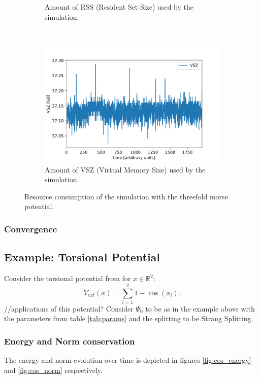 \documentclass{article}
\begin{document}
\begin{figure}[H]
\begin{subfigure}[b]{0.5 \textwidth}
    \caption{Amount of RSS (Resident Set Size) used by the simulation.}
  \end{subfigure}
  ~
  \begin{subfigure}[b]{0.5 \textwidth}
    \includegraphics[width = \textwidth]{graphics/threefold_morse/threefold_VSZ.pdf}
    \caption{Amount of VSZ (Virtual Memory Size) used by the simulation.}
  \end{subfigure}
  \caption{Resource consumption of the simulation with the threefold morse potential.}
  \label{fig:threefold_resource}
\end{figure}

\subsubsection{Convergence}


\subsection{Example: Torsional Potential}
Consider the torsional potential from \cite{torsional} for $x \in \mathbb{R}^2$:
\begin{equation}
  V_{ext}(x) = \sum_{i=1}^2 1 - \cos(x_i).
\end{equation}
//applications of this potential? \newline
Consider $\Psi_0$ to be as in the example above with the parameters from table \ref{tab:params} and the splitting to be Strang Splitting.

\subsubsection{Energy and Norm conservation}
The energy and norm evolution over time is depicted in figures \ref{fig:cos_energy} and \ref{fig:cos_norm} respectively.
\end{document}
